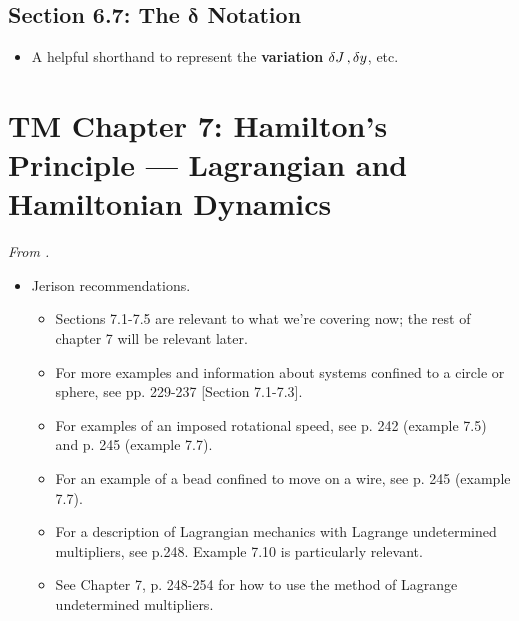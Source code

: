 \documentclass[../notes.tex]{subfiles}
\begin{document}
\subsection*{Section 6.7: The $\bm{\delta}$ Notation}
\begin{itemize}
    \item A helpful shorthand to represent the \textbf{variation} $\var{J},\var{y}$, etc.
\end{itemize}



\section{TM Chapter 7: Hamilton's Principle --- Lagrangian and Hamiltonian Dynamics}
\emph{From \textcite{bib:ThorntonMarion}.}
\begin{itemize}
    \item Jerison recommendations.
    \begin{itemize}
        \item Sections 7.1-7.5 are relevant to what we're covering now; the rest of chapter 7 will be relevant later.
        \item For more examples and information about systems confined to a circle or sphere, see pp. 229-237 [Section 7.1-7.3].
        \item For examples of an imposed rotational speed, see p. 242 (example 7.5) and p. 245 (example 7.7).
        \item For an example of a bead confined to move on a wire, see p. 245 (example 7.7).
        \item For a description of Lagrangian mechanics with Lagrange undetermined multipliers, see p.248. Example 7.10 is particularly relevant.
        \item See Chapter 7, p. 248-254 for how to use the method of Lagrange undetermined multipliers.
    \end{itemize}
\end{itemize}
\end{document}
